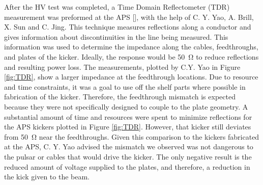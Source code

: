 After the HV test was completed, a Time Domain Reflectometer (TDR) measurement was preformed at the APS [], 
with the help of C. Y. Yao, A. Brill, X. Sun and C. Jing.
This technique measures reflections along a conductor and gives information about discontinuities in the line being measured. 
This information was used to determine the impedance along the cables, feedthroughs, and plates of the kicker. 
Ideally, the response would be \SI{50}{\ohm} to reduce reflections and resulting power loss. 
The measurements, plotted by C.Y. Yao in Figure \ref{fig:TDR}, show a larger impedance at the feedthrough locations.
Due to resource and time constraints, it was a goal to use off the shelf parts where possible in fabrication of the kicker.
Therefore, the feedthrough mismatch is expected because they were not specifically designed to couple to the plate geometry.
A substantial amount of time and resources were spent to minimize reflections for the APS kickers plotted in Figure \ref{fig:TDR}.
However, that kicker still deviates from \SI{50}{\ohm} near the feedthroughs.
Given this comparison to the kickers fabricated at the APS, C. Y. Yao advised the mismatch we observed was not dangerous to 
the pulsar or cables that would drive the kicker.  
The only negative result is the reduced amount of voltage supplied to the plates, and therefore, a reduction in the kick given to the beam.
